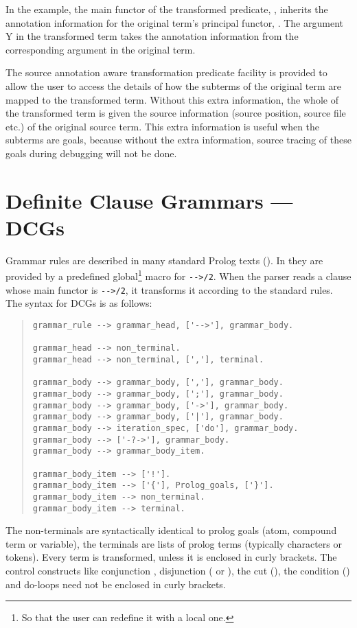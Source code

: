 In the example, the main functor of the transformed predicate, ,
inherits the annotation information for the original term's principal
functor, . The argument Y in the transformed term takes the
annotation information from the corresponding argument in the original
term.



The source annotation aware transformation predicate facility is provided to
allow the user to access the details of how the subterms of the original term
are mapped to the transformed term. Without this extra information, the whole of
the transformed term is given the source information (source position, source
file etc.) of the original source term. This extra information is useful when
the subterms are goals, because without the extra information, source tracing of
these goals during debugging will not be done.


\section{Definite Clause Grammars --- DCGs}
\label{dcg}
Grammar rules are described in many standard Prolog texts (\cite{clocksin81}).
In {\eclipse} they are provided by a predefined global\footnote{%
  So that the user can redefine it with a local one.}
macro for
{\tt -}{\tt ->/2}.
When the parser reads a clause whose main functor is
 {\tt -}{\tt ->/2}, it transforms
it according to the standard rules.
The syntax for DCGs is as follows:
\begin{quote}
\begin{verbatim}
grammar_rule --> grammar_head, ['-->'], grammar_body.

grammar_head --> non_terminal.
grammar_head --> non_terminal, [','], terminal.

grammar_body --> grammar_body, [','], grammar_body.
grammar_body --> grammar_body, [';'], grammar_body.
grammar_body --> grammar_body, ['->'], grammar_body.
grammar_body --> grammar_body, ['|'], grammar_body.
grammar_body --> iteration_spec, ['do'], grammar_body.
grammar_body --> ['-?->'], grammar_body.
grammar_body --> grammar_body_item.

grammar_body_item --> ['!'].
grammar_body_item --> ['{'], Prolog_goals, ['}'].
grammar_body_item --> non_terminal.
grammar_body_item --> terminal.
\end{verbatim}
\end{quote}
The non-terminals are syntactically identical to prolog goals (atom, compound
term or variable), the terminals are lists of prolog terms (typically
characters or tokens). Every
term is transformed, unless it is enclosed in curly brackets. The control
constructs like conjunction ,
disjunction ( or ),
the cut (), the condition () and
do-loops need not be enclosed in curly brackets.

